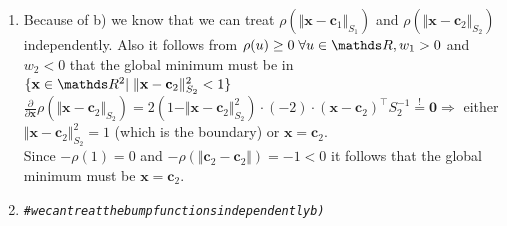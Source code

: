 \documentclass[a4paper]{article}
\makeatletter
\newcommand{\hlcom}[1]{\textcolor[rgb]{0.678,0.584,0.686}{\textit{#1}}}%
\newenvironment{kframe}{%
 \def\at@end@of@kframe{}%
 \ifinner\ifhmode%
  \def\at@end@of@kframe{\end{minipage}}%
  \begin{minipage}{\columnwidth}%
 \fi\fi%
 \def\FrameCommand##1{\hskip\@totalleftmargin \hskip-\fboxsep
 \colorbox{shadecolor}{##1}\hskip-\fboxsep
     \hskip-\linewidth \hskip-\@totalleftmargin \hskip\columnwidth}%
 \MakeFramed {\advance\hsize-\width
   \@totalleftmargin\z@ \linewidth\hsize
   \@setminipage}}%
 {\par\unskip\endMakeFramed%
 \at@end@of@kframe}
\newenvironment{knitrout}{}{} %
\makeatother
\begin{document}
{\begin{enumerate}
\begin{enumerate}
$\Rightarrow $ Eigenvalues $\mu_1, \mu_2$ of $S_2^{-1}$ are $\mu_i = 1/\lambda_i.$ \\
With this we get \\
$\Vert\mathbf{x} - \mathbf{c}_2\Vert_{S_2}^2 < 1 \iff  (\mathbf{x} - \mathbf{c}_2)^\top \mathbf{V}^\top \begin{pmatrix} 5 & 0 \\ 0 & 0.5\end{pmatrix}\mathbf{V} (\mathbf{x} - \mathbf{c}_2) < 1$ with $\vert\det\mathbf{V}\vert = 1.$ \\
$\Rightarrow$ the circle around $\mathbf{c}_2$ with radius $\sqrt{1/0.5} = \sqrt{2}$ encloses the ellipse. \\
$\Vert\mathbf{c}_2 - \mathbf{c}_1\Vert_2 = \sqrt{2\cdot 1.9^2} \approx 2.69 > 1 + \sqrt{2} \approx 2.41 \Rightarrow$ the circles can not intersect \\
$\Rightarrow$ the unit circle around $\mathbf{c}_1$ and the ellipse around $\mathbf{c}_2$ can not intersect $\Rightarrow$ only $\rho(\Vert\mathbf{x} - \mathbf{c}_1\Vert_{S_1})$ or $\rho(\Vert\mathbf{x} - \mathbf{c}_2\Vert_{S_2})$ can be non-zero for a given $\mathbf{x} \in \R^2.$ \\
\end{enumerate}
\item Because of b) we know that we can treat $\rho(\Vert\mathbf{x} - \mathbf{c}_1\Vert_{S_1})$ and $\rho(\Vert\mathbf{x} - \mathbf{c}_2\Vert_{S_2})$ independently. Also it follows from $\rho(u) \geq 0 \; \forall u \in \R, w_1 > 0$ and $w_2 < 0$ that the global minimum must be in $\{\mathbf{x} \in \R^2 |\; \Vert\mathbf{x} - \mathbf{c}_2\Vert_{S_2}^2 < 1\}$ \\
$\frac{\partial}{\partial \mathbf{x}}\rho(\Vert\mathbf{x} - \mathbf{c}_2\Vert_{S_2}) =  2(1 - \Vert\mathbf{x} - \mathbf{c}_2\Vert_{S_2}^2)\cdot (-2) \cdot (\mathbf{x} - \mathbf{c}_2)^\top S_2^{-1} \overset{!}{=} \mathbf{0} \Rightarrow$ either $\Vert\mathbf{x} - \mathbf{c}_2\Vert_{S_2}^2 = 1$ (which is the boundary) or $\mathbf{x} = \mathbf{c}_2$. \\
Since $-\rho(1) = 0$ and $-\rho(\Vert \mathbf{c}_2 - \mathbf{c}_2 \Vert) = -1 < 0$ it follows that the global minimum must be $\mathbf{x} = \mathbf{c}_2.$
\item 
\begin{knitrout}
\color{fgcolor}\begin{kframe}
\begin{alltt}
\hlcom{# we can treat the bump functions independently b)}

\end{alltt}
\end{kframe}
\end{knitrout}
\end{enumerate}}
\end{document}
